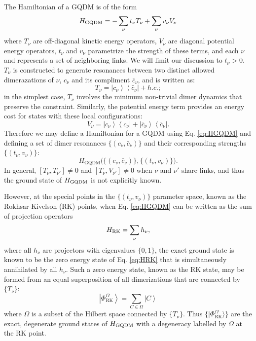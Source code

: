 \documentclass[twocolumn,prb,aps,floatfix,superscriptaddress]{revtex4-1}
\newcommand{\ket}[1]{| #1 \rangle}
\newcommand{\eket}[1]{\left | #1 \right \rangle}
\newcommand{\ebra}[1]{\left \langle #1 \right |}
\newcommand{\Eqref}[1]{Eq. \eqref{#1}}
\newcommand{\RK}{\mathrm{RK}}
\newcommand{\HGQDM}{H_\mathrm{GQDM}}
\begin{document}
The Hamiltonian of a GQDM is of the form
\begin{equation}
H_{\rm{GQDM}} = -\sum_\nu t_\nu  {T}_{\nu} + \sum_\nu v_\nu  {V}_{\nu} \label{eq:HGQDM}
\end{equation}
where ${T}_\nu$ are off-diagonal kinetic energy operators, ${V}_\nu$ are diagonal potential energy operators, $t_\nu$ and $v_\nu$ parametrize the strength of these terms, and each $\nu$ and represents a set of  neighboring links. We will limit our discussion to $t_\nu >0$. ${T}_\nu$ is constructed to generate resonances between two distinct allowed dimerazations of $\nu$, $c_\nu$ and its compliment $\bar{c}_\nu$, and is written as:
\begin{equation}
 {T}_{\nu} = \eket{c_\nu}\ebra{\bar{c}_\nu} + h.c.;
\end{equation}
in the simplest case, $ {T_\nu}$ involves the minimum non-trivial dimer dynamics that preserve the constraint. Similarly, the potential energy term provides an energy cost for states with these local configurations:
\begin{equation}
 {V}_{\nu} = \eket{c_\nu}\ebra{c_\nu} +  \eket{\bar{c}_\nu}\ebra{\bar{c}_\nu}.
\end{equation}
Therefore we may define a Hamiltonian for a GQDM using \Eqref{eq:HGQDM} and defining a set of dimer resonances $\{(c_\nu,\bar{c}_\nu)\}$ and their corresponding strengths $\{(t_\nu,v_\nu)\}$:
\begin{equation}
\HGQDM \biggl( \bigl\{\left(c_\nu,\bar{c}_\nu\right)\},\{\left(t_\nu,v_\nu\right)\bigr\}\biggr).
\end{equation}
 In general, $[T_\nu, T_{\nu'}] \neq 0 $ and $[T_\nu,V_{\nu'}]\neq0$ when $\nu$ and $\nu'$ share links, and thus the ground state of $H_{\rm{GQDM}}$ is not explicitly known.

However, at the special points in the $\{(t_\nu,v_\nu)\}$ parameter space, known as the Rokhsar-Kivelson (RK) points, when \Eqref{eq:HGQDM} can be written as the sum of projection operators
\begin{equation}
H_{\rm{RK}} = \sum_\nu  {h}_\nu \label{eq:HRK},
\end{equation}
where all $h_\nu$ are projectors with eigenvalues $\{0,1\}$, the exact ground state is known to be
the zero energy state of \Eqref{eq:HRK} that is simultaneously annihilated by all ${h}_\nu$. Such a zero energy state, known as the RK state, may be formed from an equal superposition of all dimerizations that are connected by $\{T_\nu\}$:
\begin{equation}
\eket{\Phi_{\RK}^{\Omega}} = \sum_{C \in \Omega} \eket{C}
\end{equation} 
where $\Omega$ is a subset of the Hilbert space connected by $\{T_\nu\}$. Thus $\{ \ket{\Phi_{\RK}^\Omega} \}$ are the exact, degenerate ground states of $H_{\rm{GQDM}}$ with a degeneracy labelled by $\Omega$ at the RK point.
\end{document}
